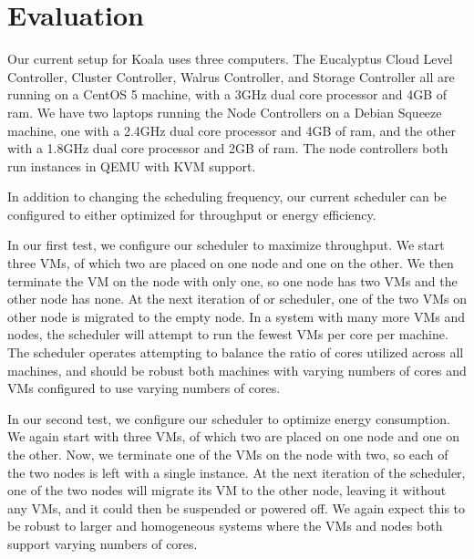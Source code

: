 \section{Evaluation}

Our current setup for Koala uses three computers.  The Eucalyptus Cloud Level Controller, Cluster Controller, Walrus Controller, and Storage Controller all are running on a CentOS 5 machine, with a 3GHz dual core processor and 4GB of ram.  We have two laptops running the Node Controllers on a Debian Squeeze machine, one with a 2.4GHz dual core processor and 4GB of ram, and the other with a 1.8GHz dual core processor and 2GB of ram.  The node controllers both run instances in QEMU with KVM support.  

In addition to changing the scheduling frequency, our current scheduler can be configured to either optimized for throughput or energy efficiency.  

In our first test, we configure our scheduler to maximize throughput.  We start three VMs, of which two are placed on one node and one on the other.  We then terminate the VM on the node with only one, so one node has two VMs and the other node has none.  At the next iteration of or scheduler, one of the two VMs on other node is migrated to the empty node.  In a system with many more VMs and nodes, the scheduler will attempt to run the fewest VMs per core per machine.  The scheduler operates attempting to balance the ratio of cores utilized across all machines, and should be robust both machines with varying numbers of cores and VMs configured to use varying numbers of cores.

In our second test, we configure our scheduler to optimize energy consumption.  We again start with three VMs, of which two are placed on one node and one on the other.  Now, we terminate one of the VMs on the node with two, so each of the two nodes is left with a single instance.  At the next iteration of the scheduler, one of the two nodes will migrate its VM to the other node, leaving it without any VMs, and it could then be suspended or powered off.  We again expect this to be robust to larger and homogeneous systems where the VMs and nodes both support varying numbers of cores.